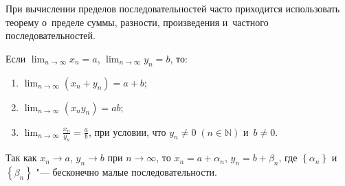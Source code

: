 
При вычислении пределов последовательностей часто приходится использовать
теорему о~пределе суммы, разности, произведения и~частного последовательностей.

\begin{Th}\label{th:3_2_3_3}
Если 
$\displaystyle \lim_{n \to \infty} x_{n} = a$,
$\displaystyle \lim_{n \to \infty} y_{n} = b$, то:

\begin{enumerate}
\item 
$\displaystyle \lim_{n \to \infty} \left( x_{n} + y_{n} \right) = a + b$;
\item
$\displaystyle \lim_{n \to \infty} \left( x_{n} y_{n} \right) = ab$;
\item
$\displaystyle \lim_{n \to \infty} \frac{x_{n}}{y_{n}} = \frac{a}{b}$,
\; при условии, что $y_{n} \ne 0 \; (n \in \mathbb{N})$ и~$b \ne 0$.
\end{enumerate}
\end{Th}

Так как $x_{n} \to a$, $y_{n} \to b$ при $n \to \infty$, то $x_{n} = a + \alpha_{n}$,
$y_{n} = b + \beta_{n}$, где $\left\{ \alpha_{n} \right\}$ и~$\left\{ \beta_{n} \right\}$
"--- бесконечно малые последовательности.

